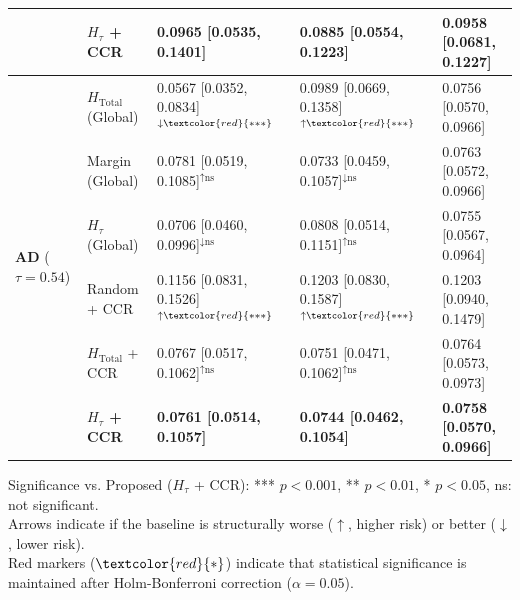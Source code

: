 \begin{table}[htbp]
{\begin{tabular}{l l l l l}
  & \textbf{$H_\tau$ + CCR} & \textbf{0.0965 [0.0535, 0.1401]} & \textbf{0.0885 [0.0554, 0.1223]} & \textbf{0.0958 [0.0681, 0.1227]} \\
\midrule
\multirow{6}{*}{\textbf{AD} ($\tau=0.54$)} & $H_{\text{Total}}$ (Global) & 0.0567 [0.0352, 0.0834]$^{\downarrow\textcolor{red}{***}}$ & 0.0989 [0.0669, 0.1358]$^{\uparrow\textcolor{red}{***}}$ & 0.0756 [0.0570, 0.0966] \\
  & Margin (Global) & 0.0781 [0.0519, 0.1085]$^{\uparrow\text{ns}}$ & 0.0733 [0.0459, 0.1057]$^{\downarrow\text{ns}}$ & 0.0763 [0.0572, 0.0966] \\
  & $H_\tau$ (Global) & 0.0706 [0.0460, 0.0996]$^{\downarrow\text{ns}}$ & 0.0808 [0.0514, 0.1151]$^{\uparrow\text{ns}}$ & 0.0755 [0.0567, 0.0964] \\
  & Random + CCR & 0.1156 [0.0831, 0.1526]$^{\uparrow\textcolor{red}{***}}$ & 0.1203 [0.0830, 0.1587]$^{\uparrow\textcolor{red}{***}}$ & 0.1203 [0.0940, 0.1479] \\
  & $H_{\text{Total}}$ + CCR & 0.0767 [0.0517, 0.1062]$^{\uparrow\text{ns}}$ & 0.0751 [0.0471, 0.1062]$^{\uparrow\text{ns}}$ & 0.0764 [0.0573, 0.0973] \\
  & \textbf{$H_\tau$ + CCR} & \textbf{0.0761 [0.0514, 0.1057]} & \textbf{0.0744 [0.0462, 0.1054]} & \textbf{0.0758 [0.0570, 0.0966]} \\
\bottomrule
\end{tabular}
}
\vspace{1ex}
{\raggedright \footnotesize
Significance vs. Proposed ($H_\tau$ + CCR): *** $p<0.001$, ** $p<0.01$, * $p<0.05$, ns: not significant. \\
Arrows indicate if the baseline is structurally worse ($\uparrow$, higher risk) or better ($\downarrow$, lower risk). \\
Red markers ($\textcolor{red}{*}$) indicate that statistical significance is maintained after Holm-Bonferroni correction ($\alpha=0.05$). \par}
\end{table}